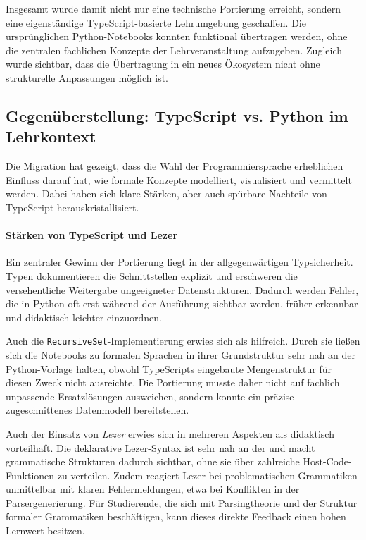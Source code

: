 Insgesamt wurde damit nicht nur eine technische Portierung erreicht, sondern eine eigenständige TypeScript-basierte Lehrumgebung geschaffen. Die ursprünglichen Python-Notebooks konnten funktional übertragen werden, ohne die zentralen fachlichen Konzepte der Lehrveranstaltung aufzugeben. Zugleich wurde sichtbar, dass die Übertragung in ein neues Ökosystem nicht ohne strukturelle Anpassungen möglich ist.

\subsection{Gegenüberstellung: TypeScript vs. Python im Lehrkontext}

Die Migration hat gezeigt, dass die Wahl der Programmiersprache erheblichen Einfluss darauf hat, wie formale Konzepte modelliert, visualisiert und vermittelt werden. Dabei haben sich klare Stärken, aber auch spürbare Nachteile von TypeScript herauskristallisiert.

\paragraph{Stärken von TypeScript und Lezer}
Ein zentraler Gewinn der Portierung liegt in der allgegenwärtigen Typsicherheit. Typen dokumentieren die Schnittstellen explizit und erschweren die versehentliche Weitergabe ungeeigneter Datenstrukturen. Dadurch werden Fehler, die in Python oft erst während der Ausführung sichtbar werden, früher erkennbar und didaktisch leichter einzuordnen.

Auch die \texttt{RecursiveSet}-Implementierung erwies sich als hilfreich. Durch sie ließen sich die Notebooks zu formalen Sprachen in ihrer Grundstruktur sehr nah an der Python-Vorlage halten, obwohl TypeScripts eingebaute Mengenstruktur für diesen Zweck nicht ausreichte. Die Portierung musste daher nicht auf fachlich unpassende Ersatzlösungen ausweichen, sondern konnte ein präzise zugeschnittenes Datenmodell bereitstellen.

Auch der Einsatz von \emph{Lezer} erwies sich in mehreren Aspekten als didaktisch vorteilhaft. Die deklarative Lezer-Syntax ist sehr nah an der  und macht grammatische Strukturen dadurch sichtbar, ohne sie über zahlreiche Host-Code-Funktionen zu verteilen. Zudem reagiert Lezer bei problematischen Grammatiken unmittelbar mit klaren Fehlermeldungen, etwa bei Konflikten in der Parsergenerierung. Für Studierende, die sich mit Parsingtheorie und der Struktur formaler Grammatiken beschäftigen, kann dieses direkte Feedback einen hohen Lernwert besitzen.

